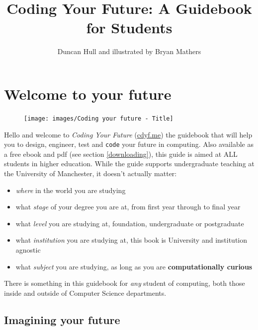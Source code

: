 \documentclass[
]{book}
\title{Coding Your Future: A Guidebook for Students}
\author{Duncan Hull and illustrated by Bryan Mathers}
\date{}
\providecommand{\tightlist}{%
  \setlength{\itemsep}{0pt}\setlength{\parskip}{0pt}}
\begin{document}
\maketitle

{
\setcounter{tocdepth}{1}
\tableofcontents
}
\hypertarget{welcome}{%
\chapter*{Welcome to your future}\label{welcome}}

\begin{figure}

{\centering \texttt{[image: images/Coding your future - Title]} 

}

\end{figure}

Hello and welcome to \emph{Coding Your Future} (\href{https://www.cdyf.me}{cdyf.me}) the guidebook that will help you to design, engineer, test and \texttt{code} your future in computing. Also available as a free ebook and pdf (see section \ref{downloading}), this guide is aimed at ALL students in higher education. While the guide supports undergraduate teaching at the University of Manchester, it doesn't actually matter:

\begin{itemize}
\tightlist
\item
  \emph{where} in the world you are studying
\item
  what \emph{stage} of your degree you are at, from first year through to final year
\item
  what \emph{level} you are studying at, foundation, undergraduate or postgraduate
\item
  what \emph{institution} you are studying at, this book is University and institution agnostic
\item
  what \emph{subject} you are studying, as long as you are \textbf{computationally curious}
\end{itemize}

There is something in this guidebook for \emph{any} student of computing, both those inside and outside of Computer Science departments. 👨🏿‍💻👨‍💻👩🏽‍💻👩‍💻👩🏿‍💻

\hypertarget{picturethis}{%
\section{Imagining your future}\label{picturethis}}
\end{document}
